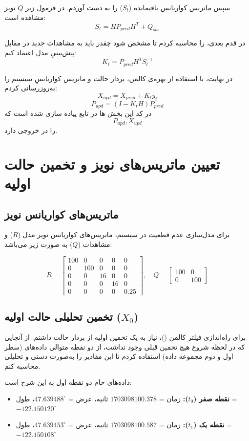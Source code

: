 \documentclass[12pt,a4paper]{article}
\begin{document}
سپس ماتریس کواریانس باقیمانده ($S_t$) را به دست آوردم. در فرمول زیر $Q$ نویز مشاهده است:
$$S_t = H P_{pred} H^T + Q_{obs}$$

در قدم بعدی،  را محاسبه کردم تا مشخص شود چقدر باید به مشاهدات جدید در مقابل پیش‌بینیِ مدل اعتماد کنم:
$$K_t = P_{pred} H^T S_t^{-1}$$

در نهایت، با استفاده از بهره‌ی کالمن، بردار حالت و ماتریس کواریانسِ  سیستم را به‌روزرسانی کردم:
$$X_{upd} = X_{pred} + K_t y_t$$
$$P_{upd} = (I - K_t H) P_{pred}$$
در کد این بخش ها در تابع  پیاده سازی شده است که $$P_{upd} , X_{upd}$$ را در خروجی دارد.

\section{تعیین ماتریس‌های نویز و تخمین حالت اولیه}

\subsection{ماتریس‌های کواریانس نویز}
برای مدل‌سازی عدم قطعیت در سیستم، ماتریس‌های کواریانس نویز مدل ($R$) و مشاهدات ($Q$) به صورت زیر می‌باشد:

$$R = \begin{bmatrix}
	100 & 0 & 0 & 0 & 0 \\
	0 & 100 & 0 & 0 & 0 \\
	0 & 0 & 16 & 0 & 0 \\
	0 & 0 & 0 & 16 & 0 \\
	0 & 0 & 0 & 0 & 0.25
\end{bmatrix}, \quad
Q = \begin{bmatrix}
	100 & 0 \\
	0 & 100
\end{bmatrix}$$

\subsection{تخمین تحلیلی حالت اولیه ($X_0$)}
برای راه‌اندازی فیلتر کالمن ()، نیاز به یک تخمین اولیه از بردار حالت داشتم. از آنجایی که در لحظه شروع هیچ تخمین قبلی وجود نداشت، از دو نقطه متوالی داده‌های  (سطر اول و دوم مجموعه داده) استفاده کردم تا این مقادیر را به‌صورت دستی و تحلیلی محاسبه کنم. 

داده‌های خام دو نقطه اول  به این شرح است:
\begin{itemize}
	\item \textbf{نقطه صفر ($t_0$):} زمان = $1703098100.378$ ثانیه، عرض = $47.639488^\circ$، طول = $-122.150120^\circ$
	\item \textbf{نقطه یک ($t_1$):} زمان = $1703098100.587$ ثانیه، عرض = $47.639453^\circ$، طول = $-122.150108^\circ$
\end{itemize}
\end{document}
